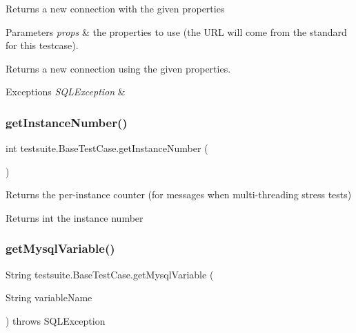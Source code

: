 Returns a new connection with the given properties


\begin{DoxyParams}{Parameters}
{\em props} & the properties to use (the U\+RL will come from the standard for this testcase).\\
\hline
\end{DoxyParams}
\begin{DoxyReturn}{Returns}
a new connection using the given properties.
\end{DoxyReturn}

\begin{DoxyExceptions}{Exceptions}
{\em S\+Q\+L\+Exception} & \\
\hline
\end{DoxyExceptions}
\mbox{\label{classtestsuite_1_1_base_test_case_a06bbcacd72ff13e3905c04aada69feea}} 
\subsubsection{\texorpdfstring{get\+Instance\+Number()}{getInstanceNumber()}}
{\footnotesize\ttfamily int testsuite.\+Base\+Test\+Case.\+get\+Instance\+Number (\begin{DoxyParamCaption}{ }\end{DoxyParamCaption})\hspace{0.3cm}{\ttfamily [protected]}}

Returns the per-\/instance counter (for messages when multi-\/threading stress tests)

\begin{DoxyReturn}{Returns}
int the instance number 
\end{DoxyReturn}
\mbox{\label{classtestsuite_1_1_base_test_case_ac50ae23586e12eaab184308368a6fb1d}} 
\subsubsection{\texorpdfstring{get\+Mysql\+Variable()}{getMysqlVariable()}}
{\footnotesize\ttfamily String testsuite.\+Base\+Test\+Case.\+get\+Mysql\+Variable (\begin{DoxyParamCaption}\item[{String}]{variable\+Name }\end{DoxyParamCaption}) throws S\+Q\+L\+Exception\hspace{0.3cm}{\ttfamily [protected]}}

